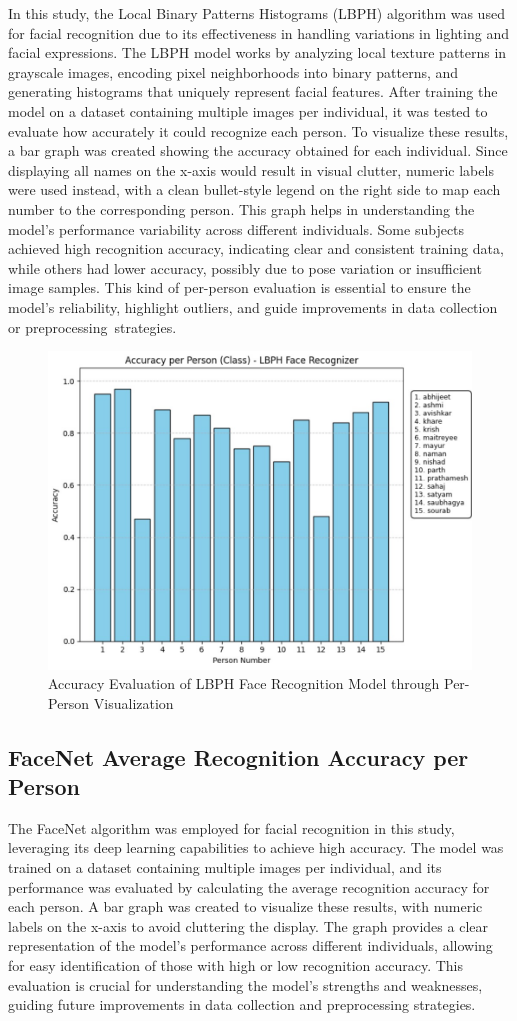 \documentclass[conference]{IEEEtran}
\begin{document}
In this study, the Local Binary Patterns Histograms (LBPH) algorithm was used for facial recognition due to its effectiveness in handling variations in lighting and facial expressions. The LBPH model works by analyzing local texture patterns in grayscale images, encoding pixel neighborhoods into binary patterns, and generating histograms that uniquely represent facial features. After training the model on a dataset containing multiple images per individual, it was tested to evaluate how accurately it could recognize each person. To visualize these results, a bar graph was created showing the accuracy obtained for each individual. Since displaying all names on the x-axis would result in visual clutter, numeric labels were used instead, with a clean bullet-style legend on the right side to map each number to the corresponding person. This graph helps in understanding the model's performance variability across different individuals. Some subjects achieved high recognition accuracy, indicating clear and consistent training data, while others had lower accuracy, possibly due to pose variation or insufficient image samples. This kind of per-person evaluation is essential to ensure the model's reliability, highlight outliers, and guide improvements in data collection or preprocessing strategies.
\begin{figure}[]
    \centering
    \includegraphics[width=.45\textwidth]{accuracy per person.jpg}
    \caption{Accuracy Evaluation of LBPH Face Recognition Model through Per-Person Visualization}
    \label{fig:Accuracy per Person (Class) - LBPH Face Recognizer}
\end{figure}
\subsection{FaceNet Average Recognition Accuracy per Person }

The FaceNet algorithm was employed for facial recognition in this study, leveraging its deep learning capabilities to achieve high accuracy. The model was trained on a dataset containing multiple images per individual, and its performance was evaluated by calculating the average recognition accuracy for each person. A bar graph was created to visualize these results, with numeric labels on the x-axis to avoid cluttering the display. The graph provides a clear representation of the model's performance across different individuals, allowing for easy identification of those with high or low recognition accuracy. This evaluation is crucial for understanding the model's strengths and weaknesses, guiding future improvements in data collection and preprocessing strategies.
\end{document}
